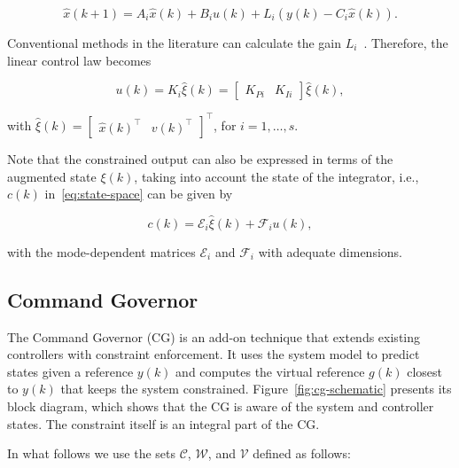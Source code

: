 \begin{equation}
	\label{eq:observer}
	\hat{x}(k+1) = A_{i}\hat{x}(k) + B_{i}u(k) + L_{i}(y(k)-C_{i}\hat{x}(k)).
\end{equation}

Conventional methods in the literature can calculate the gain
\(L_i\)~\citep{chi-tsongchen2012,Hespanha09}. Therefore, the linear control law
becomes

\begin{equation}
	\label{eq:control-law}
	u(k)= K_i \hat{\xi}(k) = \begin{bmatrix}K_{Pi} & K_{Ii} \end{bmatrix}
	\hat{\xi}(k),
\end{equation}

with \(\hat{\xi}(k) = \begin{bmatrix}\hat{x}{(k)}^\top & v{(k)}^\top
\end{bmatrix}^\top{}\), for \(i=1,\ldots,s\).

Note that the constrained output can also be expressed in terms of the augmented
state \(\xi(k)\), taking into account the state of the integrator, i.e., \(c(k)\)
in~\eqref{eq:state-space} can be given by

\begin{equation}
	\label{eq:constrained-output}
	c(k) = \mathcal{E}_i\hat{\xi}(k) + \mathcal{F}_i u(k),
\end{equation}

with the mode-dependent matrices \(\mathcal{E}_i\) and \(\mathcal{F}_i\) with
adequate dimensions.

\subsection{Command Governor}%
\label{subsec:cg}

The Command Governor (CG) is an add-on technique that extends existing
controllers with constraint enforcement. It uses the system model to predict
states given a reference \(y(k)\) and computes the virtual reference \(g(k)\)
closest to \(y(k)\) that keeps the system constrained.
Figure~\ref{fig:cg-schematic} presents its block diagram, which shows that the
CG is aware of the system and controller states. The constraint itself is an
integral part of the CG.\



In what follows we use the sets \(\mathcal{C}\), \(\mathcal{W}\), and
\(\mathcal{V}\) defined as follows:

